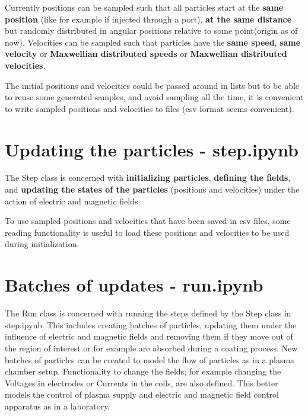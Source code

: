 \documentclass[12pt]{article}
\begin{document}
{		\noindent Currently positions can be sampled such that all particles start at the \textbf{same position} (like for example if injected through a port), \textbf{at the same distance} but randomly distributed in angular positions relative to some point(origin as of now). Velocities can be sampled such that particles have the \textbf{same speed}, \textbf{same velocity} or \textbf{Maxwellian distributed speeds} or \textbf{Maxwellian distributed velocities}.   
		
		
		
		\noindent The initial positions and velocities could be passed around in lists but to be able to reuse some generated samples, and avoid sampling all the time, it is convenient to write sampled positions and velocities to files (csv format seems convenient).
		
		
		\section{Updating the particles - step.ipynb}
		The Step class is concerned with \textbf{initializing particles}, \textbf{defining the fields}, and \textbf{updating the states of the particles} (positions and velocities) under the action of electric and magnetic fields.
		
		
		\noindent To use sampled positions and velocities that have been saved in csv files, some reading functionality is useful to load these positions and velocities to be used during initialization.
		
		
		\section{Batches of updates - run.ipynb}
		The Run class is concerned with running the steps defined by the Step class in step.ipynb. This includes creating batches of particles, updating them under the influence of electric and magnetic fields and removing them if they move out of the region of interest or for example are absorbed during a coating process. New batches of particles can be created to model the flow of particles as in a plasma chamber setup. Functionality to change the fields; for example changing the Voltages in electrodes or Currents in the coils, are also defined. This better models the control of plasma supply and electric and magnetic field control apparatus as in a laboratory.
		
		
}
\end{document}
